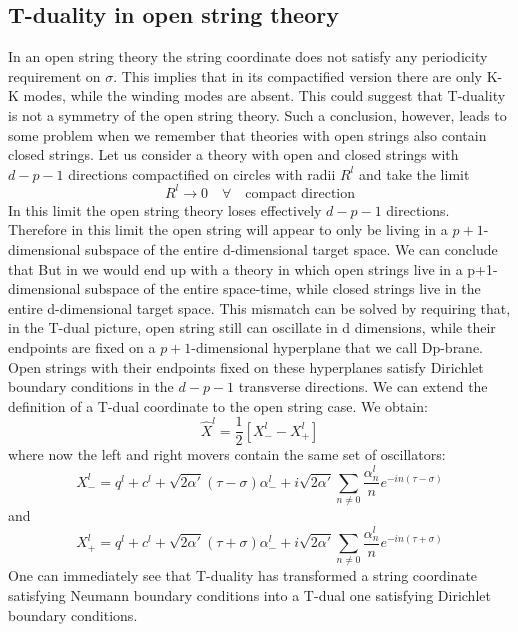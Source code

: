 \subsection{T-duality in open string theory}
In an open string theory the string coordinate does not satisfy any periodicity
requirement on $\sigma$. This implies that in its compactified version
there are only K-K modes, while the winding modes are absent. This could
suggest that T-duality is not a symmetry of the open string theory. Such a
conclusion, however, leads to some problem when we remember that theories
with open strings also contain closed strings. Let us consider a theory
with open and closed strings with $d-p-1$ directions compactified on circles
with radii $R^l$ and take the limit
\begin{equation}
	R^l\rightarrow 0\quad \forall\quad\text{compact direction}
\end{equation}
In this limit the open string theory loses effectively $d-p-1$ directions. Therefore in this limit the open string will
appear to only be living in a $p+1$-dimensional subspace of the entire d-dimensional target space. We can conclude that But in we would end up with a theory in which open strings live in a p+1-dimensional subspace of the entire space-time, while closed strings live in the entire d-dimensional target space. This mismatch can be solved by requiring that, in the T-dual
picture, open string still can oscillate in d dimensions, while their endpoints are fixed on a $p+1$-dimensional hyperplane that we call Dp-brane. Open strings with their endpoints fixed on these hyperplanes satisfy Dirichlet boundary conditions in the $d-p-1$ transverse directions. We can extend the definition of a T-dual coordinate to the open string case. We obtain:
\begin{equation}
	\hat{X}^l = \frac{1}{2}\left[X_-^l - X_+^l\right]
\end{equation}
where now the left and right movers contain the same set of oscillators:
\begin{equation}
	X_-^l = q^l + c^l + \sqrt{2\alpha'}\left(\tau-\sigma\right)\alpha_-^l + i\sqrt{2\alpha'}\sum_{n\neq 0}{\frac{\alpha_n^l}{n}e^{-in\left(\tau-\sigma\right)}}
\end{equation}
and 
\begin{equation}
	X_+^l = q^l + c^l + \sqrt{2\alpha'}\left(\tau+\sigma\right)\alpha_-^l + i\sqrt{2\alpha'}\sum_{n\neq 0}{\frac{\alpha_n^l}{n}e^{-in\left(\tau+\sigma\right)}}
\end{equation}
One can immediately see that T-duality has transformed a string coordinate satisfying Neumann boundary conditions into a T-dual one satisfying Dirichlet boundary conditions. 
